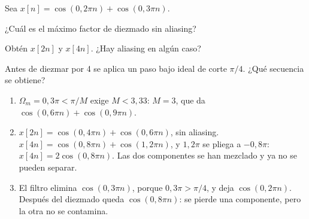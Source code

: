 \documentclass[11pt,a4paper]{scrartcl}
\begin{document}
\begin{ejercicio}[diezmado]
  Sea $x[n]=\cos(0{,}2\pi n)+\cos(0{,}3\pi n)$.
  \begin{incisos}[1]
    \item ¿Cuál es el máximo factor de diezmado sin aliasing?
    \item Obtén $x[2n]$ y $x[4n]$. ¿Hay aliasing en algún caso?
    \item Antes de diezmar por 4 se aplica un paso bajo ideal de corte $\pi/4$. ¿Qué secuencia se obtiene?
  \end{incisos}
\end{ejercicio}
\begin{solucion}
  \begin{enumerate}[label=\alph*)]
    \item $\Omega_m=0{,}3\pi<\pi/M$ exige $M<3{,}33$: $M=3$, que da $\cos(0{,}6\pi n)+\cos(0{,}9\pi n)$.
    \item $x[2n]=\cos(0{,}4\pi n)+\cos(0{,}6\pi n)$, sin aliasing. $x[4n]=\cos(0{,}8\pi n)+\cos(1{,}2\pi n)$, y $1{,}2\pi$ se pliega a $-0{,}8\pi$: $x[4n]=2\cos(0{,}8\pi n)$. Las dos componentes se han mezclado y ya no se pueden separar.
    \item El filtro elimina $\cos(0{,}3\pi n)$, porque $0{,}3\pi>\pi/4$, y deja $\cos(0{,}2\pi n)$. Después del diezmado queda $\cos(0{,}8\pi n)$: se pierde una componente, pero la otra no se contamina.
  \end{enumerate}
\end{solucion}
\end{document}
